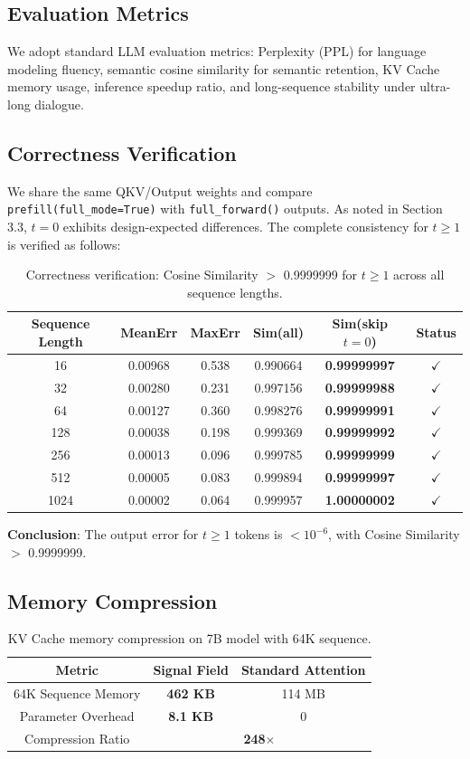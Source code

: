 \documentclass{article}
\begin{document}
\subsection{Evaluation Metrics}
We adopt standard LLM evaluation metrics: Perplexity (PPL) for language modeling fluency, semantic cosine similarity for semantic retention, KV Cache memory usage, inference speedup ratio, and long-sequence stability under ultra-long dialogue.

\subsection{Correctness Verification}
We share the same QKV/Output weights and compare \texttt{prefill(full\_mode=True)} with \texttt{full\_forward()} outputs. As noted in Section 3.3, $t=0$ exhibits design-expected differences. The complete consistency for $t \geq 1$ is verified as follows:

\begin{table}[h]
\centering
\begin{tabular}{cccccc}
\toprule
Sequence Length & MeanErr & MaxErr & Sim(all) & Sim(skip $t=0$) & Status \\
\midrule
16 & 0.00968 & 0.538 & 0.990664 & \textbf{0.99999997} & $\checkmark$ \\
32 & 0.00280 & 0.231 & 0.997156 & \textbf{0.99999988} & $\checkmark$ \\
64 & 0.00127 & 0.360 & 0.998276 & \textbf{0.99999991} & $\checkmark$ \\
128 & 0.00038 & 0.198 & 0.999369 & \textbf{0.99999992} & $\checkmark$ \\
256 & 0.00013 & 0.096 & 0.999785 & \textbf{0.99999999} & $\checkmark$ \\
512 & 0.00005 & 0.083 & 0.999894 & \textbf{0.99999997} & $\checkmark$ \\
1024 & 0.00002 & 0.064 & 0.999957 & \textbf{1.00000002} & $\checkmark$ \\
\bottomrule
\end{tabular}
\caption{Correctness verification: Cosine Similarity $>$ 0.9999999 for $t \geq 1$ across all sequence lengths.}
\end{table}

\textbf{Conclusion}: The output error for $t \geq 1$ tokens is $< 10^{-6}$, with Cosine Similarity $>$ 0.9999999.

\subsection{Memory Compression}
\begin{table}[h]
\centering
\begin{tabular}{ccc}
\toprule
Metric & Signal Field & Standard Attention \\
\midrule
64K Sequence Memory & \textbf{462 KB} & 114 MB \\
Parameter Overhead & \textbf{8.1 KB} & 0 \\
Compression Ratio & \multicolumn{2}{c}{\textbf{248$\times$}} \\
\bottomrule
\end{tabular}
\caption{KV Cache memory compression on 7B model with 64K sequence.}
\end{table}
\end{document}
